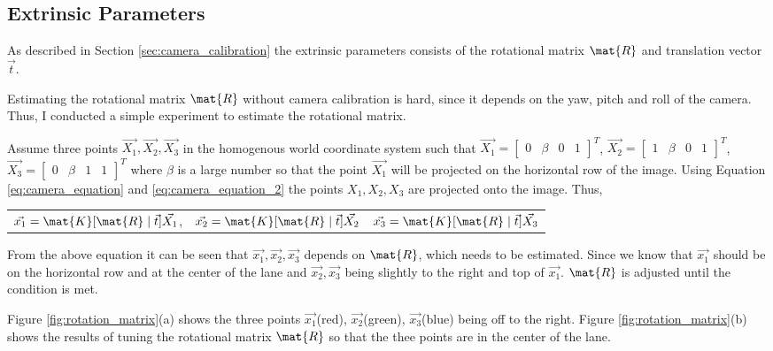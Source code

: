 \subsection{Extrinsic Parameters}
As described in Section \ref{sec:camera_calibration} the extrinsic parameters 
consists of the rotational matrix $\mat{R}$ and translation vector $\vec{t}$. 

Estimating the rotational matrix $\mat{R}$ without camera calibration is hard, since it depends on the yaw, pitch and roll of the camera. Thus, I conducted a simple experiment to estimate the rotational matrix. 

Assume three points $\vec{X_{1}}, \vec{X_{2}}, \vec{X_{3}}$ in the homogenous 
world coordinate system such that $\vec{X_{1}} = 
\begin{bmatrix}0&\beta&0&1\end{bmatrix}^{T}$, $\vec{X_{2}} = 
\begin{bmatrix}1&\beta&0&1\end{bmatrix}^{T}$, $\vec{X_{3}} = 
\begin{bmatrix}0&\beta&1&1\end{bmatrix}^{T}$ where $\beta$ is a large number so 
that the point $\vec{X_{1}}$ will be projected on the horizontal row of the 
image. Using Equation \ref{eq:camera_equation} and \ref{eq:camera_equation_2} 
the points $X_{1}, X_{2}, X_{3}$ are projected onto the image. Thus, 

\begin{center}
\begin{tabular}{c c c}
  $\vec{x_{1}} = \mat{K}[\mat{R}\mid\vec{t}]\vec{X_{1}}$, & 
  $\vec{x_{2}} = \mat{K}[\mat{R}\mid\vec{t}]\vec{X_{2}}$ &
  $\vec{x_{3}} = \mat{K}[\mat{R}\mid\vec{t}]\vec{X_{3}}$
\end{tabular}
\end{center}

From the above equation it can be seen that $\vec{x_{1}}, \vec{x_{2}}, \vec{x_{3}}$ depends on 
$\mat{R}$, which needs to be estimated. Since we know that $\vec{x_{1}}$ should be on 
the horizontal row and at the center of the lane and $\vec{x_{2}}, \vec{x_{3}}$ being 
slightly to the right and top of $\vec{x_{1}}$. $\mat{R}$ is adjusted until the condition is 
met. 

Figure \ref{fig:rotation_matrix}(a) shows the three points $\vec{x_{1}}$(red), 
$\vec{x_{2}}$(green), $\vec{x_{3}}$(blue) being off to the right. Figure 
\ref{fig:rotation_matrix}(b) shows the results of tuning the rotational matrix 
$\mat{R}$ so that the thee points are in the center of the lane.

